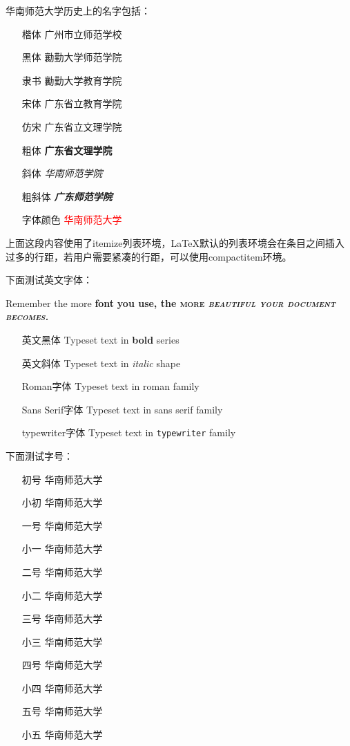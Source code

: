华南师范大学历史上的名字包括：

\begin{itemize}
\item[楷体] {\kai 广州市立师范学校}
\item[黑体] {\hei 勷勤大学师范学院}
\item[隶书] {\li 勷勤大学教育学院}
\item[宋体] {\song 广东省立教育学院}
\item[仿宋] {\fs 广东省立文理学院}
\item[粗体] {\bfseries 广东省文理学院}
\item[斜体] {\itshape 华南师范学院}
\item[粗斜体] {\bfseries\itshape 广东师范学院}
\item[字体颜色] {\textcolor{red}{华南师范大学}}
\end{itemize}

上面这段内容使用了itemize列表环境，\LaTeX{}默认的列表环境会在条目之间插入
过多的行距，若用户需要紧凑的行距，可以使用compactitem环境。

下面测试英文字体：

Remember the \textsf{more} \textbf{font} {\bfseries\tiny you \sffamily use,
\Large the \scshape more \itshape beautiful \slshape your \footnotesize
document becomes.}

\begin{itemize}
\item[英文黑体] Typeset text in \textbf{bold} series
\item[英文斜体] Typeset text in \textit{italic} shape
\item[Roman字体] Typeset text in roman family
\item[Sans Serif字体] Typeset text in \textsf{sans serif} family
\item[typewriter字体] Typeset text in \texttt{typewriter} family
\end{itemize}

下面测试字号：
\begin{itemize}
\item[初号] {\chuhao 华南师范大学}
\item[小初] {\xiaochu 华南师范大学}
\item[一号] {\yihao 华南师范大学}
\item[小一] {\xiaoyi 华南师范大学}
\item[二号] {\erhao 华南师范大学}
\item[小二] {\xiaoer 华南师范大学}
\item[三号] {\sanhao 华南师范大学}
\item[小三] {\xiaosan 华南师范大学}
\item[四号] {\sihao 华南师范大学}
\item[小四] {\xiaosi 华南师范大学}
\item[五号] {\wuhao 华南师范大学}
\item[小五] {\xiaowu 华南师范大学}
\end{itemize}

